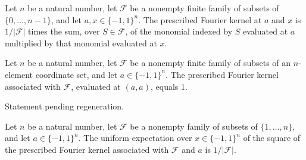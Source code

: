 \begin{theorem}
\label{FABL.prescribedFourierKernel_apply}
\leanok
{}
Let $n$ be a natural number, let $\mathcal F$ be a nonempty finite family of subsets of
$\{0,\ldots,n-1\}$, and let $a,x\in\{−1,1\}^n$. The prescribed Fourier kernel at $a$ and
$x$ is $1/|\mathcal F|$ times the sum, over $S\in\mathcal F$, of the monomial indexed by
$S$ evaluated at $a$ multiplied by that monomial evaluated at $x$.
\end{theorem}

\begin{theorem}
\label{FABL.prescribedFourierKernel_apply_self}
\leanok
{}
Let $n$ be a natural number, let $\mathcal F$ be a nonempty finite family of subsets of
an $n$-element coordinate set, and let $a\in\{−1,1\}^n$. The prescribed Fourier kernel
associated with $\mathcal F$, evaluated at $(a,a)$, equals $1$.
\end{theorem}

\begin{theorem}
\label{FABL.fourierCoeff_prescribedFourierKernel}
\leanok
{}
Statement pending regeneration.
\end{theorem}

\begin{theorem}
\label{FABL.expect_sq_prescribedFourierKernel}
\leanok
{}
Let $n$ be a natural number, let $\mathcal{F}$ be a nonempty family of subsets of
$\{1,\ldots,n\}$, and let $a\in\{-1,1\}^n$. The uniform expectation over
$x\in\{-1,1\}^n$ of the square of the prescribed Fourier kernel associated with
$\mathcal{F}$ and $a$ is $1/|\mathcal{F}|$.
\end{theorem}

